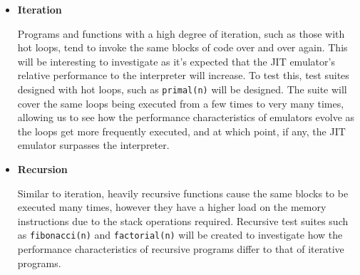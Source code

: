 \begin{itemize}
    \item \textbf{Iteration}
    
    Programs and functions with a high degree of iteration, such as those with hot loops, tend to invoke the same blocks of code over and over again. This will be interesting to investigate as it's expected that the JIT emulator's relative performance to the interpreter will increase. To test this, test suites designed with hot loops, such as \texttt{primal(n)} will be designed. The suite will cover the same loops being executed from a few times to very many times, allowing us to see how the performance characteristics of emulators evolve as the loops get more frequently executed, and at which point, if any, the JIT emulator surpasses the interpreter.

    \item \textbf{Recursion}
    
    Similar to iteration, heavily recursive functions cause the same blocks to be executed many times, however they have a higher load on the memory instructions due to the stack operations required. Recursive test suites such as \texttt{fibonacci(n)} and \texttt{factorial(n)} will be created to investigate how the performance characteristics of recursive programs differ to that of iterative programs.
\end{itemize}
